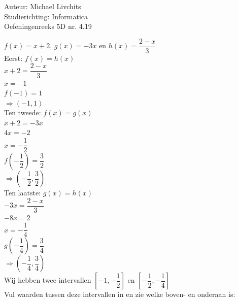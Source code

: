 \documentclass[a4paper]{article}
\begin{document}
  
\noindent \large Auteur: Michael Livchits \\
\noindent \large Studierichting: Informatica\\
\noindent \large Oefeningenreeks 5D nr. 4.19\\

\medskip

\normalsize

$f(x) = x+2$, $g(x) = -3x$ en $h(x) = \dfrac{2-x}{3}$\\

Eerst: $f(x) = h(x)$\\

$x+2 = \dfrac{2-x}{3}$\\

$x = -1$\\

$f(-1)=1$\\

$\Rightarrow (-1,1)$\\

Ten tweede: $f(x) = g(x)$\\

$x+2 = -3x$\\

$4x = -2$\\

$x = -\dfrac{1}{2}$\\

$f\left(-\dfrac{1}{2}\right)=\dfrac{3}{2}$\\

$\Rightarrow \left(-\dfrac{1}{2},\dfrac{3}{2}\right)$\\

Ten laatste: $g(x) = h(x)$\\

$-3x = \dfrac{2-x}{3}$\\

$-8x = 2$\\

$x = -\dfrac{1}{4}$\\

$g\left(-\dfrac{1}{4}\right)=\dfrac{3}{4}$\\

$\Rightarrow \left(-\dfrac{1}{4},\dfrac{3}{4}\right)$\\

Wij hebben twee intervallen $\left[-1,-\dfrac{1}{2}\right]$ en $\left[-\dfrac{1}{2},-\dfrac{1}{4}\right]$\\

Vul waarden tussen deze intervallen in en zie welke boven- en onderaan is:\\
\end{document}
